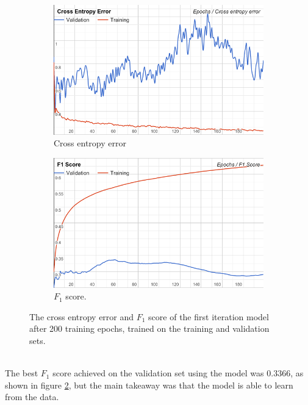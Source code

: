\begin{figure}[h!]
\begin{subfigure}{0.5\textwidth}
\includegraphics[width=1 \linewidth]{figure/results/first_iter_cross}
\caption{Cross entropy error}
\label{fig:first_iter_overfitting}
\end{subfigure}
\begin{subfigure}{0.5\textwidth}
\includegraphics[width=1\linewidth]{figure/results/first_iter_f1}
\caption{$F_1$ score.}
\label{fig:first_iter_f1}
\end{subfigure}
 
\caption{The cross entropy error and $F_1$ score of the first iteration model after 200 training epochs, trained on the training and validation sets.}
\label{fig:image2}
\end{figure}
\\
The best $F_1$ score achieved on the validation set using the model was $0.3366$, as shown in figure \ref{fig:first_iter_f1}, but the main takeaway was that the model is able to learn from the data.

